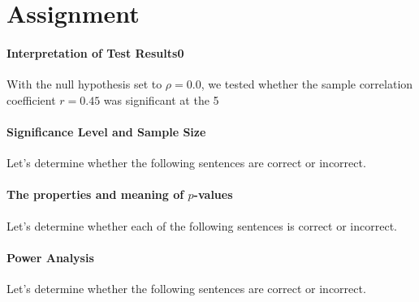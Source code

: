 \documentclass{ltjsbook}
\begin{document}
\section{Assignment}
\paragraph{Interpretation of Test Results0} With the null hypothesis set to $\rho=0.0$, we tested whether the sample correlation coefficient $r=0.45$ was significant at the 5%


\paragraph{Significance Level and Sample Size} Let's determine whether the following sentences are correct or incorrect.

\paragraph{The properties and meaning of $p$-values} Let's determine whether each of the following sentences is correct or incorrect.

\paragraph{Power Analysis} Let's determine whether the following sentences are correct or incorrect.


\end{document}
